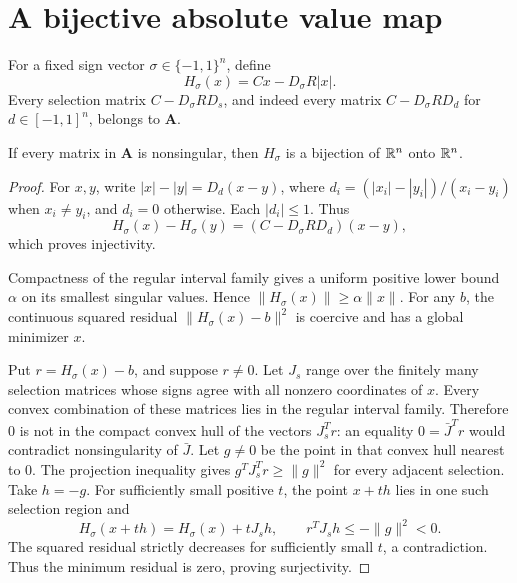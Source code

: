 \section{A bijective absolute value map}
For a fixed sign vector $\sigma\in\{-1,1\}^n$, define
\[
 H_\sigma(x)=Cx-D_\sigma R|x|.
\]
Every selection matrix $C-D_\sigma RD_s$, and indeed every matrix $C-D_\sigma RD_d$ for $d\in[-1,1]^n$, belongs to $\boldsymbol A$.
\begin{lemma}\label{lem:bijective}
If every matrix in $\boldsymbol A$ is nonsingular, then $H_\sigma$ is a bijection of $\mathbb R^n$ onto $\mathbb R^n$.
\end{lemma}
\begin{proof}
For $x,y$, write $|x|-|y|=D_d(x-y)$, where $d_i=(|x_i|-|y_i|)/(x_i-y_i)$ when $x_i\ne y_i$, and $d_i=0$ otherwise. Each $|d_i|\le1$. Thus
\[
 H_\sigma(x)-H_\sigma(y)=(C-D_\sigma RD_d)(x-y),
\]
which proves injectivity.

Compactness of the regular interval family gives a uniform positive lower bound $\alpha$ on its smallest singular values. Hence $\|H_\sigma(x)\|\ge\alpha\|x\|$. For any $b$, the continuous squared residual $\|H_\sigma(x)-b\|^2$ is coercive and has a global minimizer $x$.

Put $r=H_\sigma(x)-b$, and suppose $r\ne0$. Let $J_s$ range over the finitely many selection matrices whose signs agree with all nonzero coordinates of $x$. Every convex combination of these matrices lies in the regular interval family. Therefore $0$ is not in the compact convex hull of the vectors $J_s^Tr$: an equality $0=\bar J^Tr$ would contradict nonsingularity of $\bar J$. Let $g\ne0$ be the point in that convex hull nearest to 0. The projection inequality gives $g^TJ_s^Tr\ge\|g\|^2$ for every adjacent selection. Take $h=-g$. For sufficiently small positive $t$, the point $x+th$ lies in one such selection region and
\[
 H_\sigma(x+th)=H_\sigma(x)+tJ_sh,
 \qquad r^TJ_sh\le-\|g\|^2<0.
\]
The squared residual strictly decreases for sufficiently small $t$, a contradiction. Thus the minimum residual is zero, proving surjectivity.
\end{proof}
